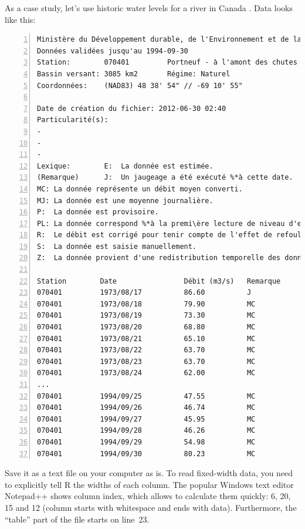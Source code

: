 \documentclass{report}
\begin{document}
		As a case study, let's use historic water levels for a river in Canada \cite{cehq}. Data looks like this:
		\begin{lstlisting}[breaklines, extendedchars, numbers=left]
Ministère du Développement durable, de l'Environnement et de la Lutte contre les changements climatiques
Données validées jusqu'au 1994-09-30
Station:        070401         Portneuf - à l'amont des chutes Philias                                                                                                        
Bassin versant: 3085 km2       Régime: Naturel                                           
Coordonnées:    (NAD83) 48 38' 54" // -69 10' 55"

Date de création du fichier: 2012-06-30 02:40
Particularité(s):
- 
- 
- 
Lexique:        E:  La donnée est estimée.
(Remarque)      J:  Un jaugeage a été exécuté %*à cette date.
MC: La donnée représente un débit moyen converti.
MJ: La donnée est une moyenne journalière.
P:  La donnée est provisoire.
PL: La donnée correspond %*à la premi\ère lecture de niveau d'eau de la journée.
R:  Le débit est corrigé pour tenir compte de l'effet de refoulement.
S:  La donnée est saisie manuellement.
Z:  La donnée provient d'une redistribution temporelle des données enregistrées en raison d'une défectuosité de l'appareil de mesure.

Station        Date                Débit (m3/s)   Remarque
070401         1973/08/17          86.60          J
070401         1973/08/18          79.90          MC
070401         1973/08/19          73.30          MC
070401         1973/08/20          68.80          MC
070401         1973/08/21          65.10          MC
070401         1973/08/22          63.70          MC
070401         1973/08/23          63.70          MC
070401         1973/08/24          62.00          MC
...
070401         1994/09/25          47.55          MC
070401         1994/09/26          46.74          MC
070401         1994/09/27          45.95          MC
070401         1994/09/28          46.26          MC
070401         1994/09/29          54.98          MC
070401         1994/09/30          80.23          MC
		\end{lstlisting}
		Save it as a text file on your computer as is. To read fixed-width data, you need to explicitly tell R the widths of each column. The popular Windows text editor Notepad++ shows column index, which allows to calculate them quickly: 6, 20, 15 and 12 (column starts with whitespace and ends with data). Furthermore, the ``table'' part of the file starts on line~23.
		
\end{document}
